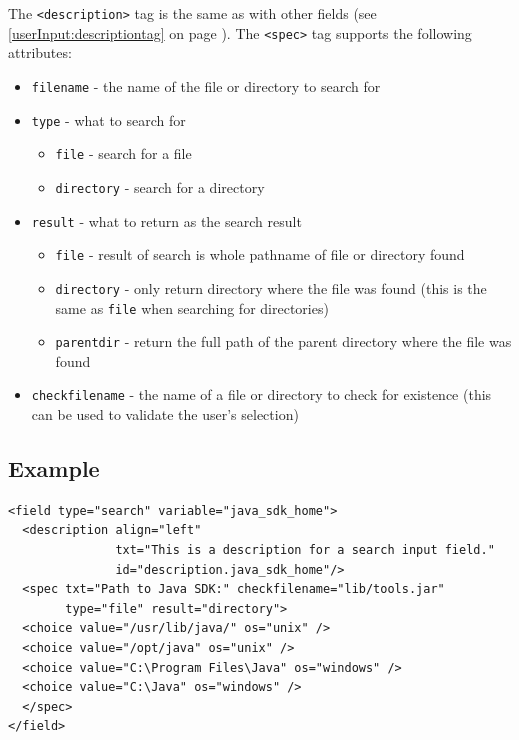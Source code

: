 The \texttt{<description>} tag is the same as with other fields (see
\ref{userInput:descriptiontag} on page \pageref{userInput:descriptiontag}). The
\texttt{<spec>} tag supports the following attributes:

\begin{itemize}
\item \texttt{filename} - the name of the file or directory to search for
\item \texttt{type} - what to search for
  \begin{itemize}
  \item \texttt{file} - search for a file
  \item \texttt{directory} - search for a directory
  \end{itemize}
\item \texttt{result} - what to return as the search result
  \begin{itemize}
  \item \texttt{file} - result of search is whole pathname of file or directory found
  \item \texttt{directory} - only return directory where the file was found (this is the same as \texttt{file} when searching for directories)
  \item \texttt{parentdir} - return the full path of the parent directory where the file was found
  \end{itemize}
\item \texttt{checkfilename} - the name of a file or directory to check for existence (this can be used to validate the user's selection)
\end{itemize}

\subsection{Example}

\footnotesize
\begin{verbatim}
<field type="search" variable="java_sdk_home">
  <description align="left" 
               txt="This is a description for a search input field."
               id="description.java_sdk_home"/>
  <spec txt="Path to Java SDK:" checkfilename="lib/tools.jar"
        type="file" result="directory">
  <choice value="/usr/lib/java/" os="unix" />
  <choice value="/opt/java" os="unix" />
  <choice value="C:\Program Files\Java" os="windows" />
  <choice value="C:\Java" os="windows" />
  </spec>
</field>
\end{verbatim}
\normalsize
